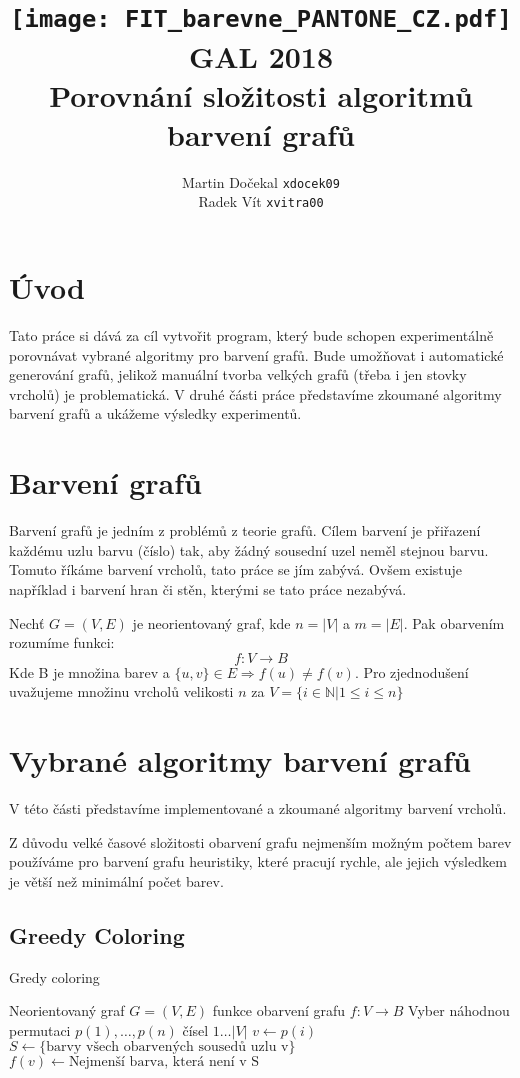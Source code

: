 \documentclass[12pt, a4paper]{article}
\author{Martin Dočekal \texttt{xdocek09}\\Radek Vít \texttt{xvitra00}}
\title{
	\texttt{[image: FIT\_barevne\_PANTONE\_CZ.pdf]}\\
	GAL 2018\\
	Porovnání složitosti algoritmů barvení grafů
}
\begin{document}
\newpage
\maketitle

\newpage

\section{Úvod}
Tato práce si dává za cíl vytvořit program, který bude schopen experimentálně porovnávat vybrané algoritmy pro barvení grafů. Bude umožňovat i automatické generování grafů, jelikož manuální tvorba velkých grafů (třeba i jen stovky vrcholů) je problematická.
V druhé části práce představíme zkoumané algoritmy barvení grafů a ukážeme výsledky experimentů.

\section{Barvení grafů}
Barvení grafů je jedním z problémů z teorie grafů. Cílem barvení je přiřazení každému uzlu barvu (číslo) tak, aby žádný sousední uzel neměl stejnou barvu.
Tomuto říkáme barvení vrcholů, tato práce se jím zabývá.
Ovšem existuje například i barvení hran či stěn, kterými se tato práce nezabývá. %

Nechť $G=(V,E)$ je neorientovaný graf, kde $n = |V|$ a $m = |E|$. Pak obarvením rozumíme funkci:
$$f: 	V \rightarrow B$$
Kde B je množina barev a $\{ u, v \} \in E \Rightarrow f(u) \not= f(v)$. %
Pro zjednodušení uvažujeme množinu vrcholů velikosti $n$ za $V = \{ i \in \mathbb{N} | 1 \leq i \leq n \}$

\section{Vybrané algoritmy barvení grafů}
V této části představíme implementované a zkoumané algoritmy barvení vrcholů.

Z důvodu velké časové složitosti obarvení grafu nejmenším možným počtem barev používáme
pro barvení grafu heuristiky, které pracují rychle, ale jejich výsledkem je větší než minimální počet barev.
\subsection{Greedy Coloring}
\begin{algorithm}
\caption{Gredy coloring} %
\label{Greedy coloring}
\begin{algorithmic}
\Input Neorientovaný graf $G = (V, E)$
\Output funkce obarvení grafu $f: 	V \rightarrow B$
\State Vyber náhodnou permutaci $p(1), \dots, p(n)$ čísel $1 \dots |V|$
	\State $v \leftarrow p(i)$
	\State $S \leftarrow \{ \text{barvy všech obarvených sousedů uzlu v} \}$
	\State $f(v) \leftarrow \text{Nejmenší barva, která není v S}$ 
\EndFor
\end{algorithmic}
\end{algorithm}
\end{document}
